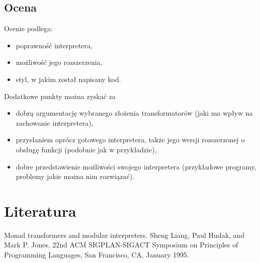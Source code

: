 \documentclass[11pt,wide]{mwart}
\begin{document}
\subsection{Ocena}
Ocenie podlega:\begin{itemize}
  \item poprawność interpretera,
  \item możliwość jego rozszerzenia,
  \item styl, w jakim został napisany kod.
\end{itemize}
Dodatkowe punkty można zyskać za \begin{itemize}
  \item dobrą argumentację wybranego złożenia transformatorów (jaki ma wpływ na zachowanie interpretera),
  \item przysłaniem oprócz gotowego interpretera, także jego wersji rozszerzonej o obsługę funkcji (podobnie jak w przykładzie),
  \item dobre przedstawienie możliwości swojego interpretera (przykładowe programy, problemy jakie można nim rozwiązać).
\end{itemize}
\section{Literatura}
Monad transformers and modular interpreters. Sheng Liang, Paul Hudak, and Mark P. Jones. 22nd ACM SIGPLAN-SIGACT Symposium on Principles of Programming Languages, San Francisco, CA, January 1995.
\end{document}
